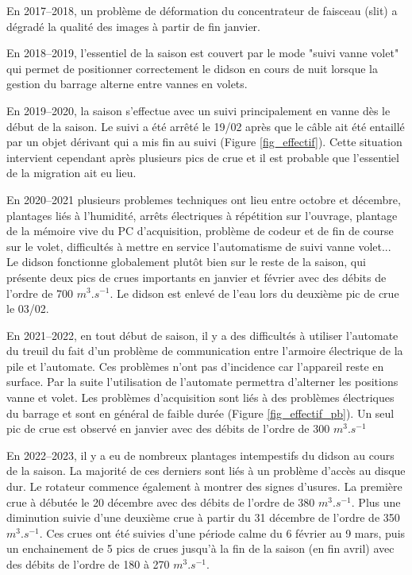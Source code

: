 \documentclass[11pt,twocolumn,titlepage,twoside]{article}
\begin{document}
En 2017--2018, un problème de déformation du concentrateur de faisceau (slit) a dégradé
la qualité des images à partir de fin janvier.

En 2018--2019, l'essentiel de la saison est couvert par le mode "suivi
vanne volet" qui permet de positionner correctement le didson en cours de
nuit lorsque la gestion du barrage alterne entre vannes en volets. 

En 2019--2020, la saison s'effectue avec un suivi principalement en vanne dès
le début de la saison. Le suivi a été arrêté le 19/02 après que le câble ait
été entaillé par un objet dérivant qui a mis fin au suivi (Figure
\ref{fig_effectif}). Cette situation intervient cependant après plusieurs pics
de crue et il est probable que l'essentiel de la migration ait eu lieu.

En 2020--2021 plusieurs problemes techniques ont lieu entre octobre et décembre, 
plantages liés à l'humidité, arrêts électriques à répétition sur l'ouvrage,
plantage de la mémoire vive du PC d'acquisition, problème de codeur et de fin de course sur le
volet, difficultés à mettre en service l'automatisme de suivi vanne volet...
Le didson fonctionne globalement plutôt bien sur le reste de la saison, qui
présente deux pics de crues importants en janvier et février avec des débits de
l'ordre de 700 $m^3.s^{-1}$. Le didson est enlevé de l'eau lors du deuxième pic
de crue le 03/02. 

En 2021--2022, en tout début de saison, il y a des difficultés à utiliser
l'automate du treuil du fait d'un problème de communication entre l'armoire
électrique de la pile et l'automate. Ces problèmes n'ont pas d'incidence car
l'appareil reste en surface. Par la suite l'utilisation de
l'automate permettra d'alterner les positions vanne et volet. 
Les problèmes d'acquisition sont liés à des problèmes électriques du
barrage et sont en général de faible durée (Figure \ref{fig_effectif_pb}).
Un seul pic de crue est observé en janvier avec des débits de l'ordre de 300
$m^3.s^{-1}$

En 2022--2023, il y a eu de nombreux plantages intempestifs du didson au cours de la saison.
La majorité de ces derniers sont liés à un problème d'accès au disque dur. 
Le rotateur commence également à montrer des signes d'usures.
La première crue à débutée le 20 décembre avec des débits de l'ordre de 
380 $m^3.s^{-1}$. Plus une diminution suivie d'une deuxième crue à partir 
du 31 décembre de l'ordre de 350 $m^3.s^{-1}$. 
Ces crues ont été suivies d'une période calme du 6 février au 9 mars, puis un
enchainement de 5 pics de crues jusqu'à la fin de la saison (en fin avril) 
avec des débits de l'ordre de 180 à 270 $m^3.s^{-1}$.
\end{document}
